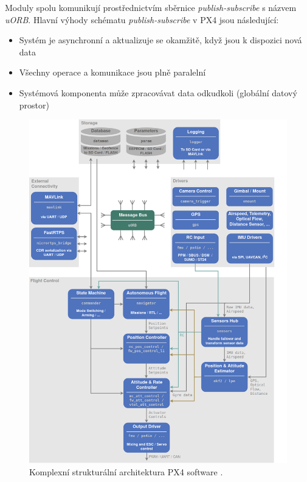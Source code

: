 Moduly spolu komunikují prostřednictvím sběrnice \textit{publish-subscribe} s názvem \textit{uORB}. Hlavní výhody schématu \textit{publish-subscribe} v PX4 jsou následující:

\begin{itemize}
    \item Systém je asynchronní a aktualizuje se okamžitě, když jsou k dispozici nová data
    \item Všechny operace a komunikace jsou plně paralelní
    \item Systémová komponenta může zpracovávat data odkudkoli (globální datový prostor)
\end{itemize}

\begin{figure}[!ht]
    \begin{center}
        \includegraphics[scale=0.46]{obrazky/PX41}
    \end{center}
    \caption[Komplexní strukturální architektura PX4 software]{Komplexní strukturální architektura PX4 software \cite{PX4docs}.}
    \label{fig:PX4_Arch}
\end{figure}

